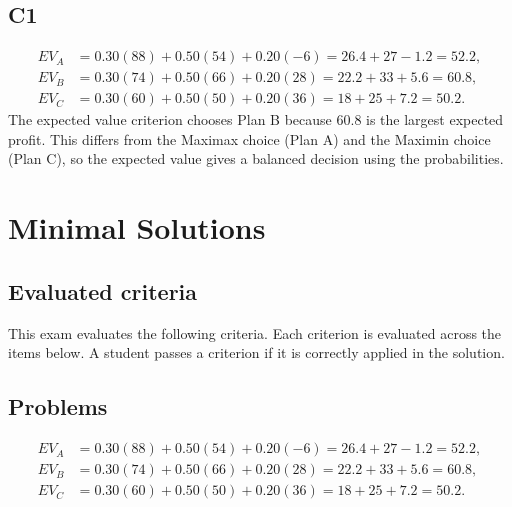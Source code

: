 \begin{ExamProblems}
		\subsection*{C1}
		\[
		\begin{aligned}
		EV_A &= 0.30(88)+0.50(54)+0.20(-6)=26.4+27-1.2=52.2,\\
		EV_B &= 0.30(74)+0.50(66)+0.20(28)=22.2+33+5.6=60.8,\\
		EV_C &= 0.30(60)+0.50(50)+0.20(36)=18+25+7.2=50.2.
		\end{aligned}
		\]
		The expected value criterion chooses Plan B because $60.8$ is the largest expected profit. This differs from the Maximax choice (Plan A) and the Maximin choice (Plan C), so the expected value gives a balanced decision using the probabilities.
	\end{ExamProblems}


\section{Minimal Solutions}

\subsection*{Evaluated criteria}
This exam evaluates the following criteria. Each criterion is evaluated across the items below. A student passes a criterion if it is correctly applied in the solution.

\subsection*{Problems}
\[\begin{aligned}
		EV_A &= 0.30(88)+0.50(54)+0.20(-6)=26.4+27-1.2=52.2,\\
		EV_B &= 0.30(74)+0.50(66)+0.20(28)=22.2+33+5.6=60.8,\\
		EV_C &= 0.30(60)+0.50(50)+0.20(36)=18+25+7.2=50.2.
		\end{aligned}\]



